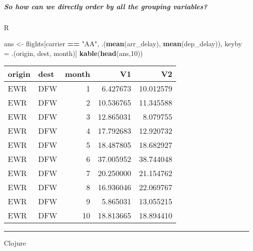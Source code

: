 \documentclass[]{article}
\newenvironment{Shaded}{\begin{snugshade}}{\end{snugshade}}
\newcommand{\KeywordTok}[1]{\textcolor[rgb]{0.13,0.29,0.53}{\textbf{#1}}}
\newcommand{\DecValTok}[1]{\textcolor[rgb]{0.00,0.00,0.81}{#1}}
\newcommand{\StringTok}[1]{\textcolor[rgb]{0.31,0.60,0.02}{#1}}
\newcommand{\VariableTok}[1]{\textcolor[rgb]{0.00,0.00,0.00}{#1}}
\newcommand{\OperatorTok}[1]{\textcolor[rgb]{0.81,0.36,0.00}{\textbf{#1}}}
\newcommand{\NormalTok}[1]{#1}
\let\oldsubparagraph\subparagraph
\renewcommand{\subparagraph}[1]{\oldsubparagraph{#1}\mbox{}}
\begin{document}
\subparagraph{So how can we directly order by all the grouping
variables?}\label{so-how-can-we-directly-order-by-all-the-grouping-variables}

R

\begin{Shaded}
\begin{Highlighting}[]
\NormalTok{ans <-}\StringTok{ }\NormalTok{flights[carrier }\OperatorTok{==}\StringTok{ "AA"}\NormalTok{,}
\NormalTok{        .(}\KeywordTok{mean}\NormalTok{(arr_delay), }\KeywordTok{mean}\NormalTok{(dep_delay)),}
\NormalTok{        keyby =}\StringTok{ }\NormalTok{.(origin, dest, month)]}
\KeywordTok{kable}\NormalTok{(}\KeywordTok{head}\NormalTok{(ans,}\DecValTok{10}\NormalTok{))}
\end{Highlighting}
\end{Shaded}

\begin{longtable}[]{@{}llrrr@{}}
\toprule
origin & dest & month & V1 & V2\tabularnewline
\midrule
\endhead
EWR & DFW & 1 & 6.427673 & 10.012579\tabularnewline
EWR & DFW & 2 & 10.536765 & 11.345588\tabularnewline
EWR & DFW & 3 & 12.865031 & 8.079755\tabularnewline
EWR & DFW & 4 & 17.792683 & 12.920732\tabularnewline
EWR & DFW & 5 & 18.487805 & 18.682927\tabularnewline
EWR & DFW & 6 & 37.005952 & 38.744048\tabularnewline
EWR & DFW & 7 & 20.250000 & 21.154762\tabularnewline
EWR & DFW & 8 & 16.936046 & 22.069767\tabularnewline
EWR & DFW & 9 & 5.865031 & 13.055215\tabularnewline
EWR & DFW & 10 & 18.813665 & 18.894410\tabularnewline
\bottomrule
\end{longtable}

\begin{center}\rule{0.5\linewidth}{0.5pt}\end{center}

Clojure

\begin{Shaded}
\end{Shaded}
\end{document}
